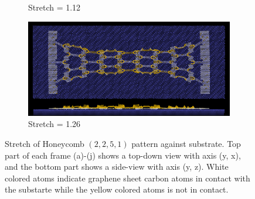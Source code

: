 \begin{figure}[H]
\begin{subfigure}[b]{0.49\textwidth}
        \caption{Stretch = 1.12}
        \label{fig:}
    \end{subfigure}
    \begin{subfigure}[b]{0.49\textwidth}
        \centering
        \includegraphics[width=\textwidth]{figures/baseline/contact_vs_stretch/honeycomb/hon_stretch0126.png}
        \caption{Stretch = 1.26}
        \label{fig:}
    \end{subfigure}
    \hfill
       \caption{Stretch of Honeycomb $(2,2,5,1)$ pattern against substrate. Top part of each frame (a)-(j) shows a top-down view with axis (y, x), and the bottom part shows a side-view with axis (y, z). White colored atoms indicate graphene sheet carbon atoms in contact with the substarte while the yellow colored atoms is not in contact.}
       \label{fig:}
  \end{figure}
  



  

